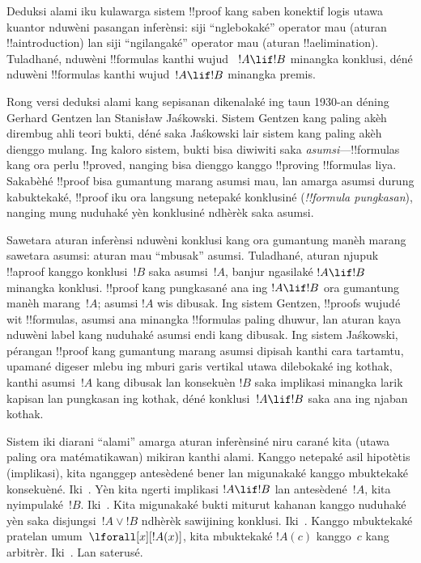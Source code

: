 \documentclass[../../../include/open-logic-section]{subfiles}
\begin{document}


Deduksi alami iku kulawarga sistem !!{proof} kang saben
konektif logis utawa kuantor nduwèni pasangan inferènsi:
siji ``nglebokaké'' operator mau (aturan
!!a{introduction}) lan siji ``ngilangaké'' operator
mau (aturan !!a{elimination}). Tuladhané,
\Intro{\lif} nduwèni !!{formula}s kanthi wujud
~$!A \lif !B$ minangka konklusi, déné \Elim{\lif}
nduwèni !!{formula}s kanthi wujud~$!A \lif !B$
minangka premis.

Rong versi deduksi alami kang sepisanan dikenalaké ing
taun 1930-an déning Gerhard Gentzen lan Stanisław Jaśkowski.
Sistem Gentzen kang paling akèh dirembug ahli teori bukti,
déné saka Jaśkowski lair sistem kang paling akèh dienggo
mulang. Ing kaloro sistem, bukti bisa diwiwiti saka
\emph{asumsi}---!!{formula}s kang ora perlu
!!{prove}d, nanging bisa dienggo kanggo !!{proving}
!!{formula}s liya. Sakabèhé !!{proof} bisa gumantung
marang asumsi mau, lan amarga asumsi durung kabuktekaké,
!!{proof} iku ora langsung netepaké konklusiné
(\emph{!!{formula} pungkasan}), nanging mung nuduhaké
yèn konklusiné ndhèrèk saka asumsi.

Sawetara aturan inferènsi nduwèni konklusi kang ora
gumantung manèh marang sawetara asumsi: aturan mau
``mbusak'' asumsi. Tuladhané, aturan \Intro{\lif}
njupuk !!a{proof} kanggo konklusi~$!B$ saka
asumsi~$!A$, banjur ngasilaké $!A \lif !B$ minangka
konklusi. !!{proof} kang pungkasané ana ing
$!A \lif !B$ ora gumantung manèh marang~$!A$;
asumsi $!A$ wis dibusak. Ing sistem Gentzen,
!!{proof}s wujudé wit !!{formula}s, asumsi ana minangka
!!{formula}s paling dhuwur, lan aturan kaya~\Intro{\lif}
nduwèni label kang nuduhaké asumsi endi kang dibusak.
Ing sistem Jaśkowski, pérangan !!{proof} kang gumantung
marang asumsi dipisah kanthi cara tartamtu, upamané
digeser mlebu ing mburi garis vertikal utawa dilebokaké
ing kothak, kanthi asumsi~$!A$ kang dibusak lan
konsekuèn $!B$ saka implikasi minangka larik kapisan
lan pungkasan ing kothak, déné konklusi~$!A \lif !B$
saka \Intro{\lif} ana ing njaban kothak.

Sistem iki diarani ``alami'' amarga aturan inferènsiné
niru carané kita (utawa paling ora matématikawan)
mikiran kanthi alami. Kanggo netepaké asil hipotètis
(implikasi), kita nganggep antesèdené bener lan
migunakaké kanggo mbuktekaké konsekuèné.
Iki~\Intro{\lif}. Yèn kita ngerti implikasi
$!A \lif !B$ lan antesèdené~$!A$, kita nyimpulaké~$!B$.
Iki~\Elim{\lif}. Kita migunakaké bukti miturut kahanan
kanggo nuduhaké yèn saka disjungsi~$!A \lor !B$
ndhèrèk sawijining konklusi. Iki~\Elim{\lor}.
Kanggo mbuktekaké pratelan umum~$\lforall[x][!A(x)]$,
kita mbuktekaké $!A(c)$ kanggo~$c$ kang arbitrèr.
Iki~\Intro{\lforall}. Lan saterusé.
\end{document}
